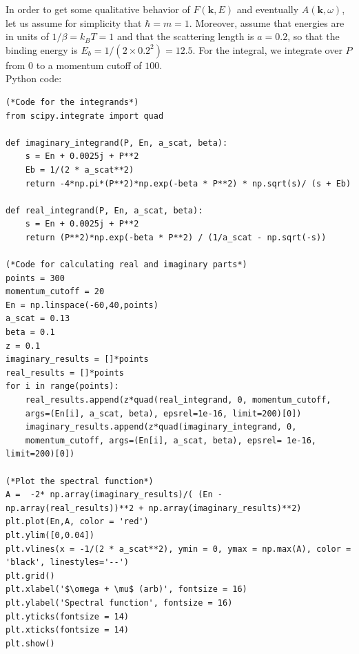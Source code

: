 \documentclass{article}
\theoremstyle{definition}
\begin{document}
\noindent In order to get some qualitative behavior of $F(\mathbf{k}, E)$ and eventually $A(\mathbf{k}, \omega)$, let us assume for simplicity that $\hbar = m = 1$. Moreover, assume that energies are in units of $1/\beta = k_B T = 1$ and that the scattering length is $a = 0.2$, so that the binding energy is $E_b = 1/(2 \times 0.2^2) = 12.5$. For the integral, we integrate over $P$ from 0 to a momentum cutoff of $100$.  \\

\noindent Python code: 
\begin{lstlisting}
(*Code for the integrands*)
from scipy.integrate import quad

def imaginary_integrand(P, En, a_scat, beta):
    s = En + 0.0025j + P**2
    Eb = 1/(2 * a_scat**2)
    return -4*np.pi*(P**2)*np.exp(-beta * P**2) * np.sqrt(s)/ (s + Eb)

def real_integrand(P, En, a_scat, beta):
    s = En + 0.0025j + P**2
    return (P**2)*np.exp(-beta * P**2) / (1/a_scat - np.sqrt(-s))
        
(*Code for calculating real and imaginary parts*)
points = 300
momentum_cutoff = 20
En = np.linspace(-60,40,points)
a_scat = 0.13
beta = 0.1
z = 0.1
imaginary_results = []*points
real_results = []*points
for i in range(points):
    real_results.append(z*quad(real_integrand, 0, momentum_cutoff, 
    args=(En[i], a_scat, beta), epsrel=1e-16, limit=200)[0])
    imaginary_results.append(z*quad(imaginary_integrand, 0, 
    momentum_cutoff, args=(En[i], a_scat, beta), epsrel= 1e-16, limit=200)[0])
        
(*Plot the spectral function*)
A =  -2* np.array(imaginary_results)/( (En - np.array(real_results))**2 + np.array(imaginary_results)**2)
plt.plot(En,A, color = 'red')
plt.ylim([0,0.04])
plt.vlines(x = -1/(2 * a_scat**2), ymin = 0, ymax = np.max(A), color = 'black', linestyles='--')
plt.grid()
plt.xlabel('$\omega + \mu$ (arb)', fontsize = 16)
plt.ylabel('Spectral function', fontsize = 16)
plt.yticks(fontsize = 14)
plt.xticks(fontsize = 14)
plt.show()
\end{lstlisting}
\end{document}
